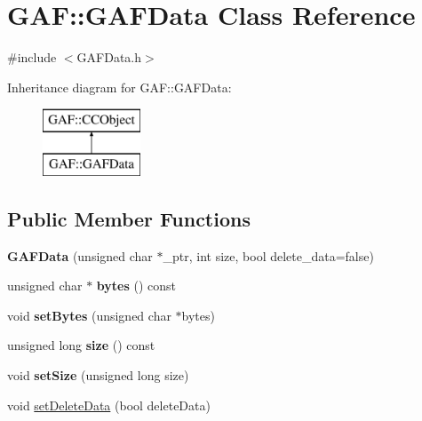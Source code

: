 \hypertarget{class_g_a_f_1_1_g_a_f_data}{\section{G\-A\-F\-:\-:G\-A\-F\-Data Class Reference}
\label{class_g_a_f_1_1_g_a_f_data}
}


{\ttfamily \#include $<$G\-A\-F\-Data.\-h$>$}

Inheritance diagram for G\-A\-F\-:\-:G\-A\-F\-Data\-:\begin{figure}[H]
\begin{center}
\leavevmode
\includegraphics[height=2.000000cm]{class_g_a_f_1_1_g_a_f_data}
\end{center}
\end{figure}
\subsection*{Public Member Functions}
\begin{DoxyCompactItemize}
\item 
\hypertarget{class_g_a_f_1_1_g_a_f_data_aef1f44d75c6f72f2d28e24c7a3fd1a1f}{{\bfseries G\-A\-F\-Data} (unsigned char $\ast$\-\_\-ptr, int size, bool delete\-\_\-data=false)}\label{class_g_a_f_1_1_g_a_f_data_aef1f44d75c6f72f2d28e24c7a3fd1a1f}

\item 
\hypertarget{class_g_a_f_1_1_g_a_f_data_a20ce92e7efd7fb55b57e373b747515d1}{unsigned char $\ast$ {\bfseries bytes} () const }\label{class_g_a_f_1_1_g_a_f_data_a20ce92e7efd7fb55b57e373b747515d1}

\item 
\hypertarget{class_g_a_f_1_1_g_a_f_data_a9ddeff084b3c488fadec36afeaf24354}{void {\bfseries set\-Bytes} (unsigned char $\ast$bytes)}\label{class_g_a_f_1_1_g_a_f_data_a9ddeff084b3c488fadec36afeaf24354}

\item 
\hypertarget{class_g_a_f_1_1_g_a_f_data_aaabf7529ff1314ed6bbe0381c3dd2d9f}{unsigned long {\bfseries size} () const }\label{class_g_a_f_1_1_g_a_f_data_aaabf7529ff1314ed6bbe0381c3dd2d9f}

\item 
\hypertarget{class_g_a_f_1_1_g_a_f_data_a32f7e574f4f2afbb76dd0f07594e64e9}{void {\bfseries set\-Size} (unsigned long size)}\label{class_g_a_f_1_1_g_a_f_data_a32f7e574f4f2afbb76dd0f07594e64e9}

\item 
void \hyperlink{class_g_a_f_1_1_g_a_f_data_a562c8e9f3b3ba2713c16286a4e6bcf41}{set\-Delete\-Data} (bool delete\-Data)
\end{DoxyCompactItemize}


